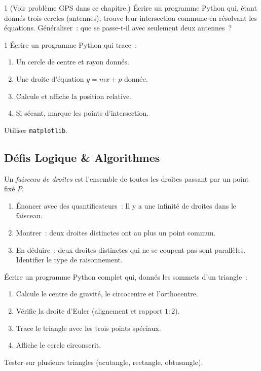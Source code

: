 \begin{probleme}{1}
(Voir probl\`eme GPS dans ce chapitre.)
\'Ecrire un programme Python qui, \'etant donn\'es trois cercles (antennes),
trouve leur intersection commune en r\'esolvant les \'equations.
G\'en\'eraliser~: que se passe-t-il avec seulement deux antennes~?
\end{probleme}

\begin{probleme}{1}
\'Ecrire un programme Python qui trace~:
\begin{enumerate}
  \item Un cercle de centre et rayon donn\'es.
  \item Une droite d'\'equation $y=mx+p$ donn\'ee.
  \item Calcule et affiche la position relative.
  \item Si s\'ecant, marque les points d'intersection.
\end{enumerate}
Utiliser \texttt{matplotlib}.
\end{probleme}

\subsection*{D\'efis Logique \& Algorithmes}

\begin{challenge}
Un \emph{faisceau de droites} est l'ensemble de toutes les droites
passant par un point fix\'e $P$.
\begin{enumerate}
  \item \'Enoncer avec des quantificateurs~:
        \og Il y a une infinit\'e de droites dans le faisceau.\fg
  \item Montrer~: deux droites distinctes ont au plus un point commun.
  \item En d\'eduire~: deux droites distinctes qui ne se coupent pas sont parall\`eles.
        Identifier le type de raisonnement.
\end{enumerate}
\end{challenge}

\begin{challenge}
\'Ecrire un programme Python complet qui, donn\'es les sommets d'un triangle~:
\begin{enumerate}
  \item Calcule le centre de gravité, le circocentre et l'orthocentre.
  \item V\'erifie la droite d'Euler (alignement et rapport $1:2$).
  \item Trace le triangle avec les trois points sp\'eciaux.
  \item Affiche le cercle circonscrit.
\end{enumerate}
Tester sur plusieurs triangles (acutangle, rectangle, obtusangle).
\end{challenge}

